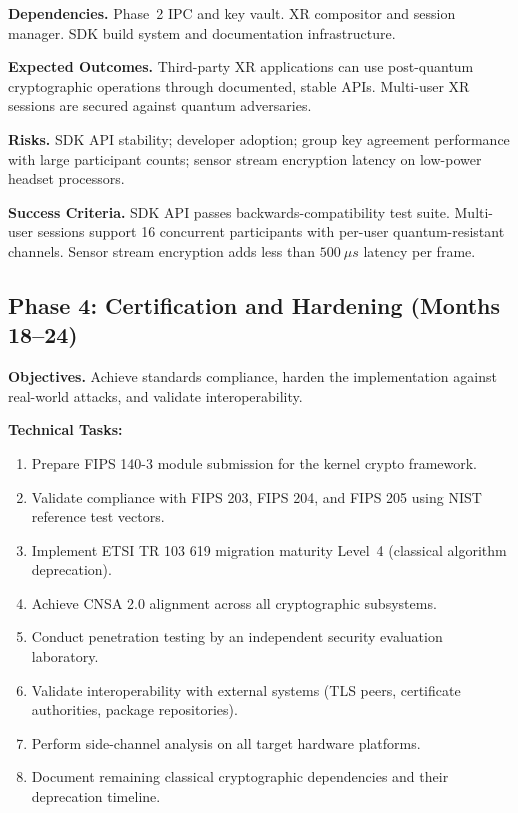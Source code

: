 \documentclass[11pt, a4paper]{article}
\begin{document}
\textbf{Dependencies.} Phase~2 IPC and key vault. XR compositor and session manager. SDK build system and documentation infrastructure.

\textbf{Expected Outcomes.} Third-party XR applications can use post-quantum cryptographic operations through documented, stable APIs. Multi-user XR sessions are secured against quantum adversaries.

\textbf{Risks.} SDK API stability; developer adoption; group key agreement performance with large participant counts; sensor stream encryption latency on low-power headset processors.

\textbf{Success Criteria.} SDK API passes backwards-compatibility test suite. Multi-user sessions support 16 concurrent participants with per-user quantum-resistant channels. Sensor stream encryption adds less than $500~\mu s$ latency per frame.

\subsection{Phase 4: Certification and Hardening (Months 18--24)}\label{sec:phase4}

\textbf{Objectives.} Achieve standards compliance, harden the implementation against real-world attacks, and validate interoperability.

\textbf{Technical Tasks:}
\begin{enumerate}
    \item Prepare FIPS 140-3 module submission for the kernel crypto framework.
    \item Validate compliance with FIPS 203, FIPS 204, and FIPS 205 using NIST reference test vectors.
    \item Implement ETSI TR 103 619 migration maturity Level~4 (classical algorithm deprecation).
    \item Achieve CNSA 2.0 alignment across all cryptographic subsystems.
    \item Conduct penetration testing by an independent security evaluation laboratory.
    \item Validate interoperability with external systems (TLS peers, certificate authorities, package repositories).
    \item Perform side-channel analysis on all target hardware platforms.
    \item Document remaining classical cryptographic dependencies and their deprecation timeline.
\end{enumerate}
\end{document}
